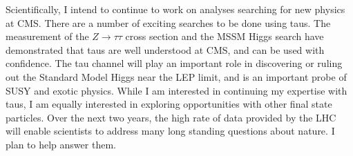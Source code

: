 \documentclass{scrartcl}        %
\begin{document}
\begin{cv}{}
Scientifically, I intend to continue to work on analyses searching for new
physics at CMS\@.  There are a number of exciting searches to be done 
using taus.  The measurement of the $Z\to\tau\tau$ cross section and the MSSM
Higgs search have demonstrated that taus are well understood at CMS, and can
be used with confidence.  The tau channel will play an important role in
discovering or ruling out the Standard Model Higgs near the LEP limit, and is an
important probe of SUSY and exotic physics. While I am interested in continuing
my expertise with taus, I am equally interested in exploring opportunities with
other final state particles.  Over the next two years, the high rate of data
provided by the LHC will enable scientists to address many long standing
questions about nature. I plan to help answer them. 

\end{cv}
\end{document}

